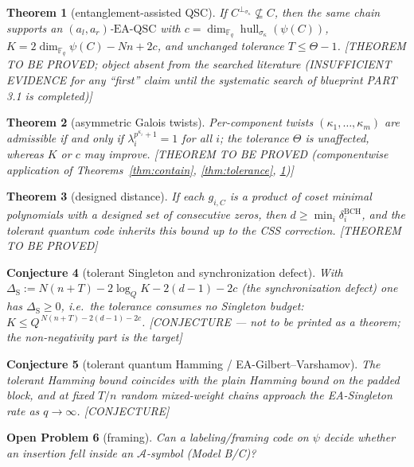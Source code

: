\documentclass[11pt]{article}
\newtheorem{theorem}{Theorem}[section]
\theoremstyle{definition}
\theoremstyle{remark}
\theoremstyle{plain}
\newtheorem{conjecture}[theorem]{Conjecture}
\newtheorem{openproblem}[theorem]{Open Problem}
\newcommand{\Fq}{\mathbb{F}_q}
\newcommand{\Aalg}{\mathcal{A}}
\newcommand{\hull}{\operatorname{hull}}
\newcommand{\perpsig}{^{\perp_{\sigma_\kappa}}}
\newcommand{\Sig}{\sigma_\kappa}
\newcommand{\EAQSC}{\mathrm{EA\text{-}QSC}}
\newcommand{\Tol}{T}
\newcommand{\Th}{\Theta}
\newcommand{\status}[1]{\textnormal{\footnotesize[#1]}}
\begin{document}
\begin{theorem}[entanglement-assisted QSC]\label{thm:eaqsc}
If $C\perpsig\not\subseteq C$, then the same chain supports an $(a_l,a_r)$-$\EAQSC$ with
$c=\dim_{\Fq}\hull_{\Sig}(\psi(C))$, $K=2\dim_{\Fq}\psi(C)-Nn+2c$, and \emph{unchanged}
tolerance $\Tol\le\Th-1$.
\status{THEOREM TO BE PROVED; object absent from the searched literature
(INSUFFICIENT EVIDENCE for any ``first'' claim until the systematic search of blueprint
PART 3.1 is completed)}
\end{theorem}

\begin{theorem}[asymmetric Galois twists]\label{thm:asym}
Per-component twists $(\kappa_1,\dots,\kappa_m)$ are admissible if and only if
$\lambda_i^{p^{\kappa_i}+1}=1$ for all $i$; the tolerance $\Th$ is unaffected, whereas $K$ or
$c$ may improve. \status{THEOREM TO BE PROVED (componentwise application of
Theorems~\ref{thm:contain}, \ref{thm:tolerance}, \ref{thm:eaqsc})}
\end{theorem}

\begin{theorem}[designed distance]\label{thm:bch}
If each $g_{i,C}$ is a product of coset minimal polynomials with a designed set of consecutive
zeros, then $d\ge\min_i\delta^{\mathrm{BCH}}_i$, and the tolerant quantum code inherits this
bound up to the CSS correction. \status{THEOREM TO BE PROVED}
\end{theorem}

\begin{conjecture}[tolerant Singleton and synchronization defect]\label{con:singleton}
With $\Delta_{\mathrm{S}}:=N(n+\Tol)-2\log_QK-2(d-1)-2c$ (the synchronization defect) one has
$\Delta_{\mathrm{S}}\ge0$, i.e.\ the tolerance consumes no Singleton budget:
$K\le Q^{\,N(n+\Tol)-2(d-1)-2c}$.
\status{CONJECTURE --- not to be printed as a theorem; the non-negativity part is the target}
\end{conjecture}

\begin{conjecture}[tolerant quantum Hamming / EA-Gilbert--Varshamov]\label{con:hamming}
The tolerant Hamming bound coincides with the plain Hamming bound on the padded block, and at
fixed $\Tol/n$ random mixed-weight chains approach the EA-Singleton rate as $q\to\infty$.
\status{CONJECTURE}
\end{conjecture}

\begin{openproblem}[framing]\label{op:framing}
Can a labeling/framing code on $\psi$ decide whether an insertion fell \emph{inside} an
$\Aalg$-symbol (Model B/C)?
\end{openproblem}
\end{document}
